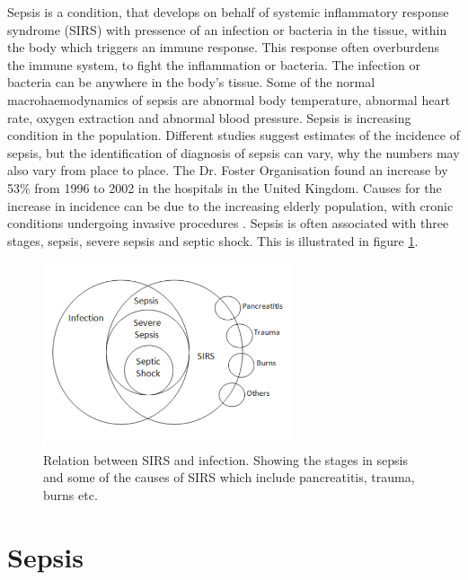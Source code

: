 
\label{chap:sepsis}
Sepsis is a condition, that develops on behalf of systemic inflammatory response syndrome (SIRS) with pressence of an infection or bacteria in the tissue, within the body which triggers an immune response. This response often overburdens the immune system, to fight the inflammation or bacteria. The infection or bacteria can be anywhere in the body’s tissue. Some of the normal macrohaemodynamics of sepsis are abnormal body temperature, abnormal heart rate, oxygen extraction and abnormal blood pressure.\cite{plunta2010,kanta2014} Sepsis is increasing condition in the population. Different studies suggest estimates of the incidence of sepsis, but the identification of diagnosis of sepsis can vary, why the numbers may also vary from place to place.\cite{baudouin2008,kanta2014} The Dr. Foster Organisation found an increase by 53\% from 1996 to 2002 in the hospitals in the United Kingdom. Causes for the increase in incidence can be due to the increasing elderly population, with cronic conditions undergoing invasive procedures \cite{baudouin2008}.
Sepsis is often associated with three stages, sepsis, severe sepsis and septic shock. This is illustrated in figure \ref{fig:Sepsis_stages}.

\begin{figure}[H]
	\centering	\includegraphics[width=0.65\textwidth]{figures/Sepsis_stages}
	\caption{Relation between SIRS and infection. Showing the stages in sepsis and some of the causes of SIRS which include pancreatitis, trauma, burns etc.\cite{kanta2014}}
	\label{fig:Sepsis_stages}
\end{figure} \vspace{-.3cm}

\section{Sepsis}

